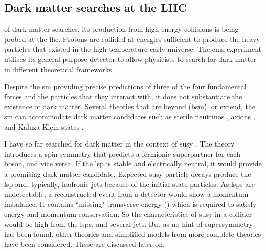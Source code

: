 \subsection{Dark matter searches at the LHC}
\label{subsec:dm_searches_lhc}

\iffalse


 of dark matter searches, its production from high-energy collisions is being probed at the \acrshort{lhc}. Protons are collided at energies sufficient to produce the heavy particles that existed in the high-temperature early universe. The \acrfull{cms} experiment utilises its general purpose detector to allow physicists to search for dark matter in different theoretical frameworks.

Despite the \acrlong{sm} providing precise predictions of three of the four fundamental forces and the particles that they interact with, it does not substantiate the existence of dark matter. Several theories that are beyond (\acrshort{bsm}), or extend, the \acrlong{sm} can accommodate dark matter candidates such as sterile neutrinos \cite{doi:10.1142/S0218301313300191}, axions \cite{1981PhLB..104..199D}, and Kaluza-Klein states \cite{Han:1998sg}.

I have so far searched for dark matter in the context of \acrfull{susy} \cite{Martin:1997ns}. The theory introduces a spin symmetry that predicts a fermionic superpartner for each boson, and vice versa. If the \acrfull{lsp} is stable and electrically neutral, it would provide a promising dark matter candidate. Expected \acrshort{susy} particle decays produce the \acrshort{lsp} and, typically, hadronic jets because of the initial state particles. As \glspl{lsp} are undetectable, a reconstructed event from a detector would show a momentum imbalance. It contains ``missing" transverse energy () which is required to satisfy energy and momentum conservation. So the characteristics of \acrshort{susy} in a collider would be high \etmiss from the \glspl{lsp}, and several jets. But as no hint of supersymmetry has been found, other theories and simplified models from more complete theories have been considered. These are discussed later on.

